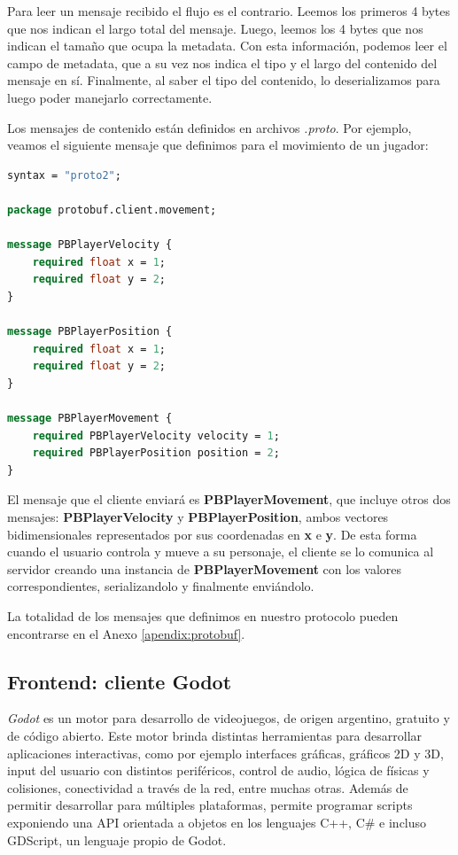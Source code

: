Para leer un mensaje recibido el flujo es el contrario. Leemos los primeros 4 bytes que nos indican el largo
total del mensaje. Luego, leemos los 4 bytes que nos indican el tamaño que ocupa la metadata. Con esta información, podemos leer
el campo de metadata, que a su vez nos indica el tipo y el largo del contenido del mensaje en sí. Finalmente, al saber el tipo del contenido, lo
deserializamos para luego poder manejarlo correctamente.

Los mensajes de contenido están definidos en archivos \textit{.proto}. Por ejemplo, veamos el siguiente
mensaje que definimos para el movimiento de un jugador:

\begin{lstlisting}[language=protobuf]
syntax = "proto2";

package protobuf.client.movement;

message PBPlayerVelocity {
    required float x = 1;
    required float y = 2;
}

message PBPlayerPosition {
    required float x = 1;
    required float y = 2;
}

message PBPlayerMovement {
    required PBPlayerVelocity velocity = 1;
    required PBPlayerPosition position = 2;
}
\end{lstlisting}

El mensaje que el cliente enviará es \textbf{PBPlayerMovement}, que incluye otros dos mensajes:
\textbf{PBPlayerVelocity} y \textbf{PBPlayerPosition}, ambos vectores bidimensionales representados
por sus coordenadas en \textbf{x} e \textbf{y}. De esta forma cuando el usuario controla y mueve a
su personaje, el cliente se lo comunica al servidor creando una instancia de \textbf{PBPlayerMovement}
con los valores correspondientes, serializandolo y finalmente enviándolo.

La totalidad de los mensajes que definimos en nuestro protocolo pueden encontrarse en el Anexo \ref{apendix:protobuf}.

\subsection{Frontend: cliente Godot}

\noindent \textit{Godot} es un motor para desarrollo de videojuegos, de origen argentino, gratuito y de código abierto. 
Este motor brinda distintas herramientas para desarrollar aplicaciones interactivas, como por ejemplo 
interfaces gráficas, gráficos 2D y 3D, input del usuario con distintos periféricos, control de audio, 
lógica de físicas y colisiones, conectividad a través de la red, entre muchas otras.
Además de permitir desarrollar para múltiples plataformas, permite programar scripts exponiendo una 
API orientada a objetos en los lenguajes C++, C\# e incluso GDScript, un lenguaje propio de Godot. 

